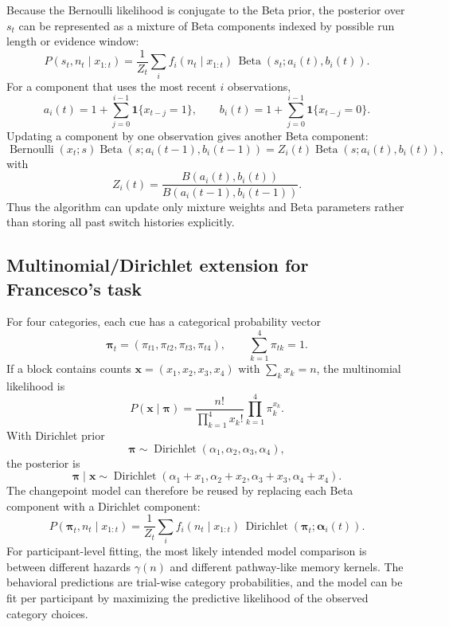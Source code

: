 Because the Bernoulli likelihood is conjugate to the Beta prior, the posterior over $s_t$ can be represented as a mixture of Beta components indexed by possible run length or evidence window:
\[
P(s_t,n_t\mid x_{1:t})
=\frac{1}{Z_t}\sum_i f_i(n_t\mid x_{1:t})\,
\operatorname{Beta}(s_t;a_i(t),b_i(t)).
\]
For a component that uses the most recent $i$ observations,
\[
a_i(t)=1+\sum_{j=0}^{i-1}\mathbf{1}\{x_{t-j}=1\},
\qquad
b_i(t)=1+\sum_{j=0}^{i-1}\mathbf{1}\{x_{t-j}=0\}.
\]
Updating a component by one observation gives another Beta component:
\[
\operatorname{Bernoulli}(x_t;s)\operatorname{Beta}(s;a_i(t-1),b_i(t-1))
=Z_i(t)\operatorname{Beta}(s;a_i(t),b_i(t)),
\]
with
\[
Z_i(t)=\frac{B(a_i(t),b_i(t))}{B(a_i(t-1),b_i(t-1))}.
\]
Thus the algorithm can update only mixture weights and Beta parameters rather than storing all past switch histories explicitly.

\subsection{Multinomial/Dirichlet extension for Francesco's task}

For four categories, each cue has a categorical probability vector
\[
\boldsymbol{\pi}_t=(\pi_{t1},\pi_{t2},\pi_{t3},\pi_{t4}),\qquad
\sum_{k=1}^{4}\pi_{tk}=1.
\]
If a block contains counts $\mathbf{x}=(x_1,x_2,x_3,x_4)$ with $\sum_k x_k=n$, the multinomial likelihood is
\[
P(\mathbf{x}\mid \boldsymbol{\pi})
=\frac{n!}{\prod_{k=1}^{4}x_k!}\prod_{k=1}^{4}\pi_k^{x_k}.
\]
With Dirichlet prior
\[
\boldsymbol{\pi}\sim\operatorname{Dirichlet}(\alpha_1,\alpha_2,\alpha_3,\alpha_4),
\]
the posterior is
\[
\boldsymbol{\pi}\mid \mathbf{x}
\sim
\operatorname{Dirichlet}(\alpha_1+x_1,\alpha_2+x_2,\alpha_3+x_3,\alpha_4+x_4).
\]
The changepoint model can therefore be reused by replacing each Beta component with a Dirichlet component:
\[
P(\boldsymbol{\pi}_t,n_t\mid x_{1:t})
=\frac{1}{Z_t}\sum_i f_i(n_t\mid x_{1:t})\,
\operatorname{Dirichlet}(\boldsymbol{\pi}_t;\boldsymbol{\alpha}_i(t)).
\]
For participant-level fitting, the most likely intended model comparison is between different hazards $\gamma(n)$ and different pathway-like memory kernels. The behavioral predictions are trial-wise category probabilities, and the model can be fit per participant by maximizing the predictive likelihood of the observed category choices.

